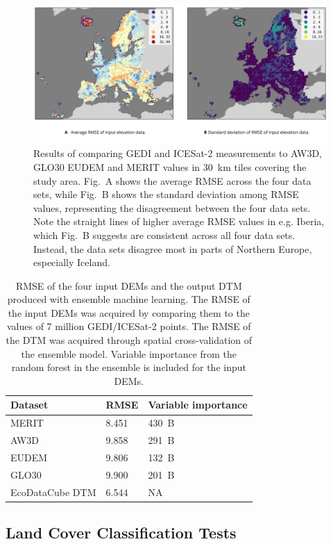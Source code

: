 \begin{figure}[!hbt]
    \includegraphics[width=\linewidth]{figs_02/fig_8_dtm_accuracy.png}
    \caption{Results of comparing GEDI and ICESat-2 measurements to AW3D, GLO30 EUDEM and MERIT values in 30\@~km tiles covering the study area. Fig.\@~A shows the average RMSE across the four data sets, while Fig.\@~B shows the standard deviation among RMSE values, representing the disagreement between the four data sets. Note the straight lines of higher average RMSE values in e.g. Iberia, which Fig.\@~B suggests are consistent across all four data sets. Instead, the data sets disagree most in parts of Northern Europe, especially Iceland.} 
    \label{fig:8_dtm_accuracy}
\end{figure}      

\begin{table}[hbt]
\centering
\caption{RMSE of the four input DEMs and the output DTM produced with ensemble machine learning. The RMSE of the input DEMs was acquired by comparing them to the values of 7 million GEDI/ICESat-2 points. The RMSE of the DTM was acquired through spatial cross-validation of the ensemble model. Variable importance from the random forest in the ensemble is included for the input DEMs.}
\label{tab:dem-accuracy}
\begin{tabular}{@{}lll@{}}
\hline
Dataset & RMSE  & Variable importance   \\ 
\hline
MERIT   & 8.451 & 430~B \\
AW3D    & 9.858 & 291~B \\
EUDEM   & 9.806 & 132~B \\
GLO30   & 9.900 & 201~B \\
\hline
EcoDataCube DTM & 6.544 & NA    \\ 
\hline
\end{tabular}
\end{table}

\subsection*{Land Cover Classification Tests}

